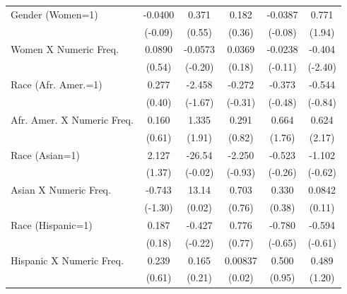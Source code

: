 {\begin{longtable}{l*{5}{c}}
Gender (Women=1)    &     -0.0400       &       0.371       &       0.182       &     -0.0387       &       0.771\sym{*}\\
                    &     (-0.09)       &      (0.55)       &      (0.36)       &     (-0.08)       &      (1.94)       \\
Women X Numeric Freq.&      0.0890       &     -0.0573       &      0.0369       &     -0.0238       &      -0.404\sym{*}\\
                    &      (0.54)       &     (-0.20)       &      (0.18)       &     (-0.11)       &     (-2.40)       \\
Race (Afr. Amer.=1) &       0.277       &      -2.458\sym{*}&      -0.272       &      -0.373       &      -0.544       \\
                    &      (0.40)       &     (-1.67)       &     (-0.31)       &     (-0.48)       &     (-0.84)       \\
Afr. Amer. X Numeric Freq.&       0.160       &       1.335\sym{*}&       0.291       &       0.664\sym{*}&       0.624\sym{*}\\
                    &      (0.61)       &      (1.91)       &      (0.82)       &      (1.76)       &      (2.17)       \\
Race (Asian=1)      &       2.127       &      -26.54       &      -2.250       &      -0.523       &      -1.102       \\
                    &      (1.37)       &     (-0.02)       &     (-0.93)       &     (-0.26)       &     (-0.62)       \\
Asian X Numeric Freq.&      -0.743       &       13.14       &       0.703       &       0.330       &      0.0842       \\
                    &     (-1.30)       &      (0.02)       &      (0.76)       &      (0.38)       &      (0.11)       \\
Race (Hispanic=1)   &       0.187       &      -0.427       &       0.776       &      -0.780       &      -0.594       \\
                    &      (0.18)       &     (-0.22)       &      (0.77)       &     (-0.65)       &     (-0.61)       \\
Hispanic X Numeric Freq.&       0.239       &       0.165       &     0.00837       &       0.500       &       0.489       \\
                    &      (0.61)       &      (0.21)       &      (0.02)       &      (0.95)       &      (1.20)       \\

\end{longtable}}
